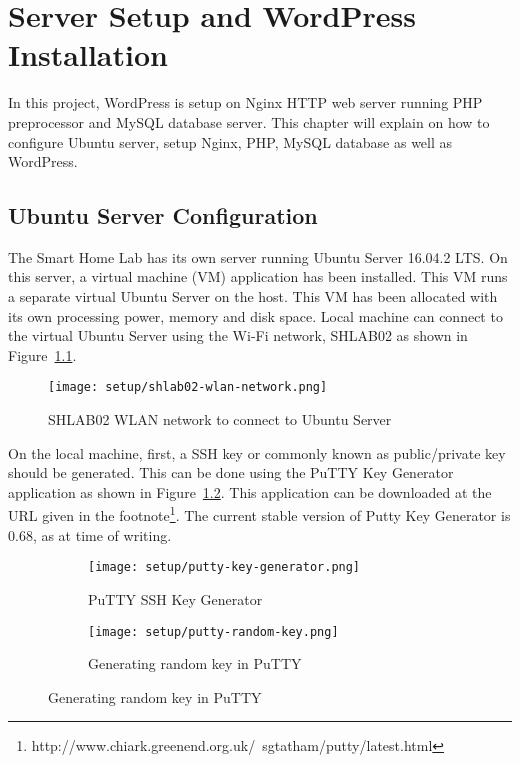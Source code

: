 \chapter{Server Setup and WordPress Installation}

In this project, WordPress is setup on Nginx HTTP web server running PHP preprocessor and MySQL database server. This chapter will explain on how to configure Ubuntu server, setup Nginx, PHP, MySQL database as well as WordPress.

\section{Ubuntu Server Configuration} \label{sec:ubuntu-server-configuration}
The Smart Home Lab has its own server running Ubuntu Server 16.04.2 LTS. On this server, a virtual machine (VM) application has been installed. This VM runs a separate virtual Ubuntu Server on the host. This VM has been allocated with its own processing power, memory and disk space. Local machine can connect to the virtual Ubuntu Server using the Wi-Fi network, SHLAB02 as shown in Figure~\ref{fig:shlab02-wlan-network}.

\begin{figure}[h]
\caption{SHLAB02 WLAN network to connect to Ubuntu Server}
\label{fig:shlab02-wlan-network}
\centering
\texttt{[image: setup/shlab02-wlan-network.png]}
\end{figure}

On the local machine, first, a SSH key or commonly known as public/private key should be generated. This can be done using the PuTTY Key Generator application as shown in Figure~\ref{fig:putty-key-generator}. This application can be downloaded at the URL given in the footnote\footnote{http://www.chiark.greenend.org.uk/~sgtatham/putty/latest.html}. The current stable version of Putty Key Generator is 0.68, as at time of writing.

\begin{figure}[h]
	\begin{subfigure}{.49\linewidth}
	\caption{PuTTY SSH Key Generator}
	\label{fig:putty-key-generator}
	\texttt{[image: setup/putty-key-generator.png]}
	\end{subfigure}
	\begin{subfigure}{.49\linewidth}
	\caption{Generating random key in PuTTY}
	\label{fig:putty-random-key}
	\texttt{[image: setup/putty-random-key.png]}
	\end{subfigure}
\end{figure}

